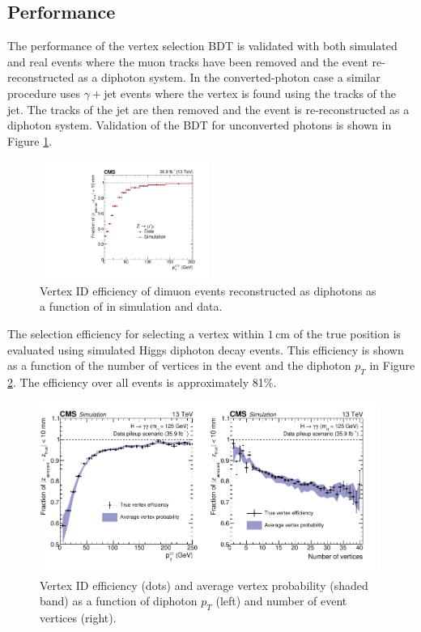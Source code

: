 \subsection{Performance}
The performance of the vertex selection BDT is validated with both simulated and real \Zmumu events where the muon tracks have been removed and the event re-reconstructed as a diphoton system. 
In the converted-photon case a similar procedure uses $\gamma + $jet events where the vertex is found using the tracks of the jet. 
The tracks of the jet are then removed and the event is re-reconstructed as a diphoton system. Validation of the BDT for unconverted photons is shown in Figure \ref{fig:object_reco:vertex_id_valid}. 
\begin{figure}[h!]
    \centering
    \includegraphics[width=0.49\textwidth]{figures/object_reco/CMS-HIG-16-040_Figure_003.pdf}
    \caption{Vertex ID efficiency of dimuon events reconstructed as diphotons as a function of \pt in simulation and data.}
        \label{fig:object_reco:vertex_id_valid}
\end{figure}

The selection efficiency for selecting a vertex within $1$\,cm of the true position is evaluated using simulated Higgs diphoton decay events. This efficiency is shown as a function of the number of vertices in the event and the diphoton $p_{T}$ in Figure \ref{fig:object_reco:vertex_id_efficiency}. The efficiency over all events is approximately 81\%.
\begin{figure}[h!]
    \centering
    \includegraphics[width=0.99\textwidth]{figures/object_reco/CMS-HIG-16-040_Figure_004.pdf}
    \caption{Vertex ID efficiency (dots) and average vertex probability (shaded band) as a function of diphoton $p_T$ (left) and number of event vertices (right).}
        \label{fig:object_reco:vertex_id_efficiency}
\end{figure}

